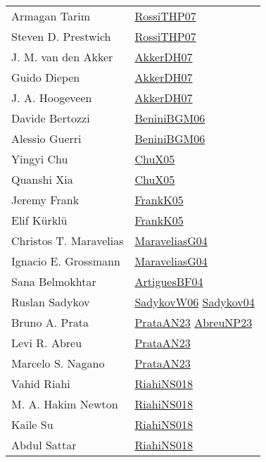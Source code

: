 {\begin{longtable}{p{4cm}p{15cm}}
Armagan Tarim & \href{papers/RossiTHP07.pdf}{RossiTHP07}\cite{RossiTHP07} \\
Steven D. Prestwich & \href{papers/RossiTHP07.pdf}{RossiTHP07}\cite{RossiTHP07} \\
J. M. van den Akker & \href{papers/AkkerDH07.pdf}{AkkerDH07}\cite{AkkerDH07} \\
Guido Diepen & \href{papers/AkkerDH07.pdf}{AkkerDH07}\cite{AkkerDH07} \\
J. A. Hoogeveen & \href{papers/AkkerDH07.pdf}{AkkerDH07}\cite{AkkerDH07} \\
Davide Bertozzi & \href{papers/BeniniBGM06.pdf}{BeniniBGM06}\cite{BeniniBGM06} \\
Alessio Guerri & \href{papers/BeniniBGM06.pdf}{BeniniBGM06}\cite{BeniniBGM06} \\
Yingyi Chu & \href{papers/ChuX05.pdf}{ChuX05}\cite{ChuX05} \\
Quanshi Xia & \href{papers/ChuX05.pdf}{ChuX05}\cite{ChuX05} \\
Jeremy Frank & \href{papers/FrankK05.pdf}{FrankK05}\cite{FrankK05} \\
Elif K{\"{u}}rkl{\"{u}} & \href{papers/FrankK05.pdf}{FrankK05}\cite{FrankK05} \\
Christos T. Maravelias & \href{papers/MaraveliasG04.pdf}{MaraveliasG04}\cite{MaraveliasG04} \\
Ignacio E. Grossmann & \href{papers/MaraveliasG04.pdf}{MaraveliasG04}\cite{MaraveliasG04} \\
Sana Belmokhtar & \href{papers/ArtiguesBF04.pdf}{ArtiguesBF04}\cite{ArtiguesBF04} \\
Ruslan Sadykov & \href{articles/SadykovW06.pdf}{SadykovW06}\cite{SadykovW06} \href{papers/Sadykov04.pdf}{Sadykov04}\cite{Sadykov04} \\
Bruno A. Prata & \href{articles/PrataAN23.pdf}{PrataAN23}\cite{PrataAN23} \href{articles/AbreuNP23.pdf}{AbreuNP23}\cite{AbreuNP23} \\
Levi R. Abreu & \href{articles/PrataAN23.pdf}{PrataAN23}\cite{PrataAN23} \\
Marcelo S. Nagano & \href{articles/PrataAN23.pdf}{PrataAN23}\cite{PrataAN23} \\
Vahid Riahi & \href{papers/RiahiNS018.pdf}{RiahiNS018}\cite{RiahiNS018} \\
M. A. Hakim Newton & \href{papers/RiahiNS018.pdf}{RiahiNS018}\cite{RiahiNS018} \\
Kaile Su & \href{papers/RiahiNS018.pdf}{RiahiNS018}\cite{RiahiNS018} \\
Abdul Sattar & \href{papers/RiahiNS018.pdf}{RiahiNS018}\cite{RiahiNS018} \\

\end{longtable}}
